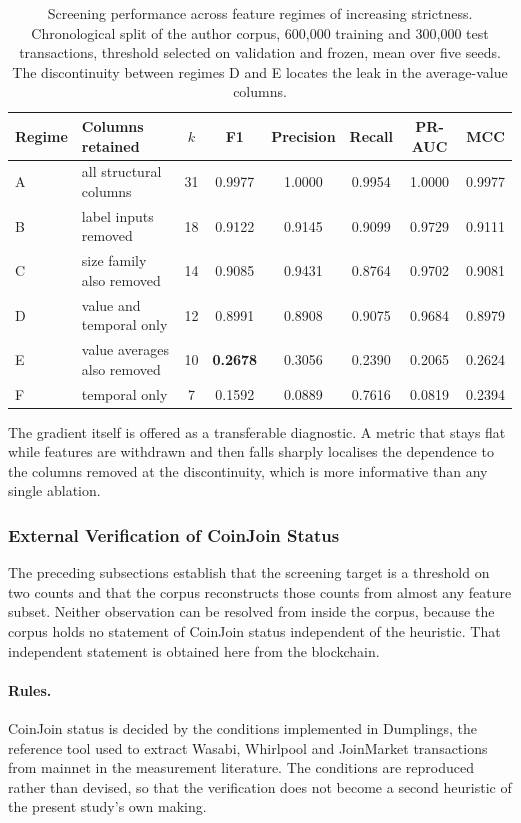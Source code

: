 \documentclass[12pt,a4paper]{article}
\begin{document}
\begin{table}[htbp]
\centering
\small
\caption{Screening performance across feature regimes of
increasing strictness. Chronological split of the author corpus,
600{,}000 training and 300{,}000 test transactions, threshold
selected on validation and frozen, mean over five seeds. The
discontinuity between regimes D and E locates the leak in the
average-value columns.}
\label{tab:leakage_gradient}
\begin{tabular}{llcccccc}
\toprule
Regime & Columns retained & $k$ & F1 & Precision & Recall & PR-AUC & MCC \\
\midrule
A & all structural columns        & 31 & 0.9977 & 1.0000 & 0.9954 & 1.0000 & 0.9977 \\
B & label inputs removed          & 18 & 0.9122 & 0.9145 & 0.9099 & 0.9729 & 0.9111 \\
C & size family also removed      & 14 & 0.9085 & 0.9431 & 0.8764 & 0.9702 & 0.9081 \\
D & value and temporal only       & 12 & 0.8991 & 0.8908 & 0.9075 & 0.9684 & 0.8979 \\
E & value averages also removed   & 10 & \textbf{0.2678} & 0.3056 & 0.2390 & 0.2065 & 0.2624 \\
F & temporal only                 &  7 & 0.1592 & 0.0889 & 0.7616 & 0.0819 & 0.2394 \\
\bottomrule
\end{tabular}
\end{table}

The gradient itself is offered as a transferable diagnostic. A
metric that stays flat while features are withdrawn and then
falls sharply localises the dependence to the columns removed at
the discontinuity, which is more informative than any single
ablation.

\subsubsection{External Verification of CoinJoin Status}
\label{sec:external_verification}

The preceding subsections establish that the screening target is
a threshold on two counts and that the corpus reconstructs those
counts from almost any feature subset. Neither observation can be
resolved from inside the corpus, because the corpus holds no
statement of CoinJoin status independent of the heuristic. That
independent statement is obtained here from the blockchain.

\paragraph{Rules.}
CoinJoin status is decided by the conditions implemented in
Dumplings, the reference tool used to extract Wasabi, Whirlpool
and JoinMarket transactions from mainnet in the measurement
literature. The conditions are reproduced rather than devised, so
that the verification does not become a second heuristic of the
present study's own making.
\end{document}
